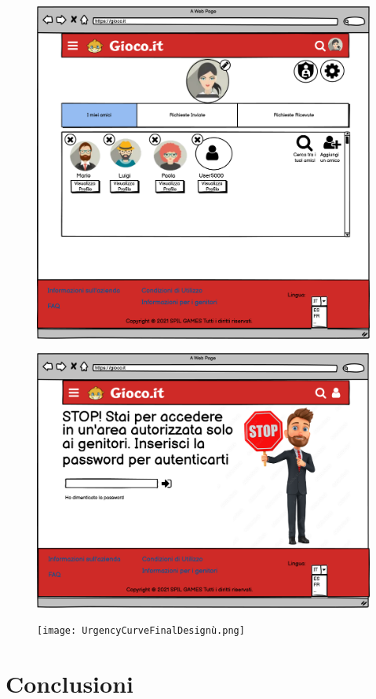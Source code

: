 \documentclass[../Report.tex]{subfiles}
\begin{document}
    \begin{figure}[H]
        \includegraphics[width=0.9\linewidth]{WAmici1 (Labeled) .png}
        \centering
    \end{figure}

    \begin{figure}[H]
        \includegraphics[width=0.9\linewidth]{WParentalControlAcces (Whit Forgotten).png}
        \centering
    \end{figure}

    \begin{figure}[H]
        \texttt{[image: UrgencyCurveFinalDesignù.png]}
        \centering
    \end{figure}
    
    \chapter{Conclusioni}
    
\end{document}
